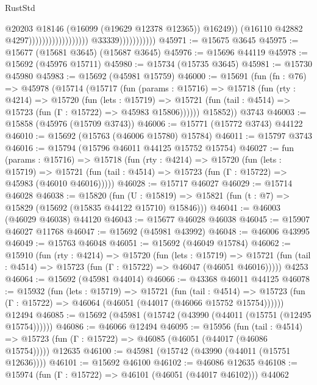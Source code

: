 \begin{lexlean}{RustStd}
\begin{coremodule}
                                                                @20203
                                                                @18146
                                                                (@16099 (@19629 @12378 @12365))
                                                                @16249))
                                                            (@16110 @42882 @4297))))))))))))))))))
                          @33339)))))))))))
@45971 := @15675 @3645
@45975 := @15677 (@15681 @3645) (@15687 @3645)
@45976 := @15696 @44119
@45978 := @15692 (@45976 @15711)
@45980 := @15734 (@15735 @3645)
@45981 := @15730 @45980
@45983 := @15692 (@45981 @15759)
@46000 := @15691
    (fun (fn : @76) =>
    @45978
      (@15714
        (@15717
          (fun (params : @15716) =>
          @15718
            (fun (rty : @4214) =>
            @15720
              (fun (lets : @15719) =>
              @15721 (fun (tail : @4514) => @15723 (fun (Γ : @15722) => @45983 @15806))))))
        @15852))
    @3743
@46003 := @15858 (@45976 (@15709 @3743))
@46006 := @15771 (@15772 @3743) @44122
@46010 := @15692 (@15763 (@46006 @15780) @15784)
@46011 := @15797 @3743
@46016 := @15794 (@15796 @46011 @44125 @15752 @15754)
@46027 := fun (params : @15716) =>
  @15718
    (fun (rty : @4214) =>
    @15720
      (fun (lets : @15719) =>
      @15721 (fun (tail : @4514) => @15723 (fun (Γ : @15722) => @45983 (@46010 @46016)))))
@46028 := @15717 @46027
@46029 := @15714 @46028
@46038 := @15820
    (fun (U : @15819) => @15821 (fun (t : @7) => @15829 (@15692 (@15835 @44122 @15710) @15846)))
@46041 := @46003 (@46029 @46038) @44120
@46043 := @15677 @46028 @46038
@46045 := @15907 @46027 @11768
@46047 := @15692 (@45981 @43992)
@46048 := @46006 @43995
@46049 := @15763 @46048
@46051 := @15692 (@46049 @15784)
@46062 := @15910
    (fun (rty : @4214) =>
    @15720
      (fun (lets : @15719) =>
      @15721 (fun (tail : @4514) => @15723 (fun (Γ : @15722) => @46047 (@46051 @46016)))))
    @4253
@46064 := @15692 (@45981 @44014)
@46066 := @43368 @46011 @44125
@46078 := @15932
    (fun (lets : @15719) =>
    @15721
      (fun (tail : @4514) =>
      @15723 (fun (Γ : @15722) => @46064 (@46051 (@44017 (@46066 @15752 @15754))))))
    @12494
@46085 := @15692 (@45981 (@15742 (@43990 (@44011 (@15751 (@12495 @15754))))))
@46086 := @46066 @12494
@46095 := @15956
    (fun (tail : @4514) => @15723 (fun (Γ : @15722) => @46085 (@46051 (@44017 (@46086 @15754)))))
    @12635
@46100 := @45981 (@15742 (@43990 (@44011 (@15751 @12636))))
@46101 := @15692 @46100
@46102 := @46086 @12635
@46108 := @15974 (fun (Γ : @15722) => @46101 (@46051 (@44017 @46102))) @44062

\end{coremodule}
\end{lexlean}
